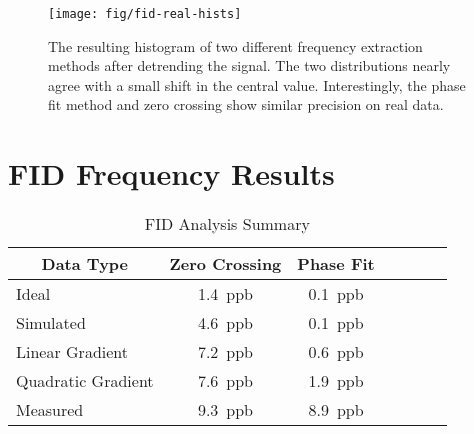 \begin{figure}
\centering
\texttt{[image: fig/fid-real-hists]}
\caption{
    The resulting histogram of two different frequency extraction methods after detrending the signal.  The two distributions nearly agree with a small shift in the central value.  Interestingly, the phase fit method and zero crossing show similar precision on real data.
    \label{fig:fid-real-hists}
}
\end{figure}

\section{FID Frequency Results}

\begin{table}[h]
\label{tab:fid-analysis-summary}
\caption{FID Analysis Summary}
\centering
\begin{tabular}{l c c c c c c}
    \hline
    \multicolumn{1}{c}{Data Type} & Zero Crossing & Phase Fit \\
    \hline
    Ideal                & \SI{1.4}{ppb}  & \SI{0.1}{ppb} \\
    Simulated            & \SI{4.6}{ppb}  & \SI{0.1}{ppb} \\
    Linear Gradient      & \SI{7.2}{ppb}  & \SI{0.6}{ppb} \\
    Quadratic Gradient   & \SI{7.6}{ppb}  & \SI{1.9}{ppb} \\
    Measured             & \SI{9.3}{ppb}  & \SI{8.9}{ppb} \\
    \hline
\end{tabular}
\end{table}
